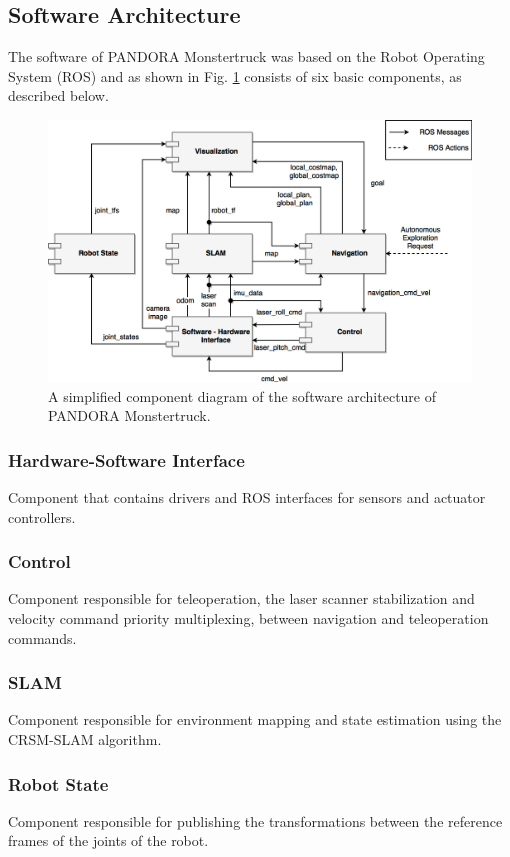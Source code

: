 \documentclass[conference]{IEEEtran}
\begin{document}
\subsection{Software Architecture}
The software of PANDORA Monstertruck was based on the Robot Operating System (ROS) and as shown in Fig. \ref{fig:component_diagram} consists of six basic components, as described below.

\begin{figure}[!ht]
	\centering
	\includegraphics[width=\linewidth]{Figures/component_diagram.png}%
	\caption{A simplified component diagram of the software architecture of PANDORA Monstertruck.}
	\label{fig:component_diagram}
\end{figure}


\subsubsection{Hardware-Software Interface}
Component that contains drivers and ROS interfaces for sensors and actuator controllers.
\subsubsection{Control}
Component responsible for teleoperation, the laser scanner stabilization and velocity command priority multiplexing, between navigation and teleoperation commands.
\subsubsection{SLAM}
Component responsible for environment mapping and state estimation using the CRSM-SLAM algorithm.
\subsubsection{Robot State}
Component responsible for publishing the transformations between the reference frames of the joints of the robot.
\end{document}

